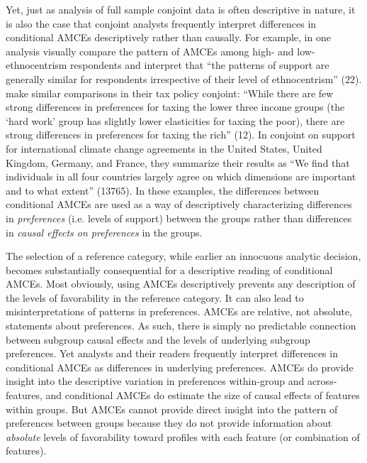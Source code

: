 \documentclass[a4paper,12pt]{article}\usepackage[]{graphicx}\usepackage[]{color}
\begin{document}
Yet, just as analysis of full sample conjoint data is often descriptive in nature, it is also the case that conjoint analysts frequently interpret differences in conditional AMCEs descriptively rather than causally. For example, in one analysis \citet{HainmuellerHopkinsYamamoto2014} visually compare the pattern of AMCEs among high- and low-ethnocentrism respondents and interpret that ``the patterns of support are generally similar for respondents irrespective of their level of ethnocentrism'' (22). \citet{BallardRosaMartinScheve2016} make similar comparisons in their tax policy conjoint: ``While there are few strong differences in preferences for taxing the lower three income groups (the `hard work' group has slightly lower elasticities for taxing the poor), there are strong differences in preferences for taxing the rich'' (12). In \citet{BechtelScheve2013} conjoint on support for international climate change agreements in the United States, United Kingdom, Germany, and France, they summarize their results as ``We find that individuals in all four countries largely agree on which dimensions are important and to what extent'' (13765). In these examples, the differences between conditional AMCEs are used as a way of descriptively characterizing differences in \textit{preferences} (i.e. levels of support) between the groups rather than differences in \textit{causal effects on preferences} in the groups.

The selection of a reference category, while earlier an innocuous analytic decision, becomes substantially consequential for a descriptive reading of conditional AMCEs. Most obviously, using AMCEs descriptively prevents any description of the levels of favorability in the reference category. It can also lead to misinterpretations of patterns in preferences. AMCEs are relative, not absolute, statements about preferences. As such, there is simply no predictable connection between subgroup causal effects and the levels of underlying subgroup preferences. Yet analysts and their readers frequently interpret differences in conditional AMCEs as differences in underlying preferences. AMCEs do provide insight into the descriptive variation in preferences within-group and across-features, and conditional AMCEs do estimate the size of causal effects of features within groups. But AMCEs cannot provide direct insight into the pattern of preferences between groups because they do not provide information about \textit{absolute} levels of favorability toward profiles with each feature (or combination of features).
\end{document}

